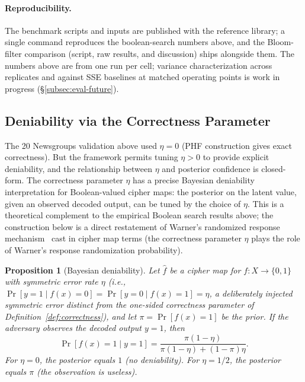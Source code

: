 \documentclass[11pt]{article}
\theoremstyle{definition}
\theoremstyle{plain}
\newtheorem{proposition}[theorem]{Proposition}
\theoremstyle{remark}
\newcommand{\fhat}{\hat{f}}
\begin{document}
\paragraph{Reproducibility.}
The benchmark scripts and inputs are published with the reference
library; a single command reproduces the boolean-search numbers above,
and the Bloom-filter comparison (script, raw results, and discussion)
ships alongside them.  The numbers above are from one run per cell;
variance characterization across replicates and against SSE baselines
at matched operating points is work in progress
(\S\ref{subsec:eval-future}).

\subsection{Deniability via the Correctness Parameter}
\label{subsec:deniability}

The 20 Newsgroups validation above used $\eta = 0$ (PHF construction
gives exact correctness).  But the framework permits tuning $\eta > 0$
to provide explicit deniability, and the relationship between $\eta$
and posterior confidence is closed-form.  The correctness parameter
$\eta$ has a precise Bayesian deniability interpretation for
Boolean-valued cipher maps: the posterior on the latent value, given
an observed decoded output, can be tuned by the choice of $\eta$.  This is a theoretical complement to the empirical
Boolean search results above; the construction below is a direct
restatement of Warner's randomized response
mechanism~\cite{warner1965randomized} cast in cipher map terms (the
correctness parameter $\eta$ plays the role of Warner's response
randomization probability).

\begin{proposition}[Bayesian deniability]
\label{prop:deniability}
Let $\fhat$ be a cipher map for $f : X \to \{0,1\}$ with symmetric
error rate $\eta$ (i.e., $\Pr[y=1 \mid f(x)=0] = \Pr[y=0 \mid f(x)=1]
= \eta$, a deliberately injected symmetric error distinct from the
one-sided correctness parameter of Definition~\ref{def:correctness}),
and let $\pi = \Pr[f(x) = 1]$ be the prior.  If the
adversary observes the decoded output $y = 1$, then
\begin{equation}
\Pr[f(x) = 1 \mid y = 1]
    = \frac{\pi(1-\eta)}{\pi(1-\eta) + (1-\pi)\eta}.
\end{equation}
For $\eta = 0$, the posterior equals $1$ (no deniability).  For
$\eta = 1/2$, the posterior equals $\pi$ (the observation is useless).
\end{proposition}
\end{document}
